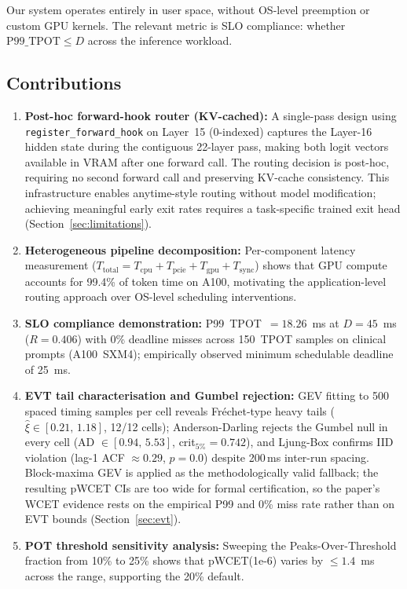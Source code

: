 \documentclass[conference]{IEEEtran}
\begin{document}
Our system operates entirely in user space, without OS-level preemption
or custom GPU kernels.
The relevant metric is SLO compliance: whether
$\text{P99\_TPOT} \leq D$ across the inference workload.

\subsection{Contributions}

\begin{enumerate}[leftmargin=*]
\item \textbf{Post-hoc forward-hook router (KV-cached):}
      A single-pass design using \texttt{register\_forward\_hook} on
      Layer~15 (0-indexed) captures the Layer-16 hidden state during the
      contiguous 22-layer pass, making both logit vectors available in
      VRAM after one forward call. The routing decision is post-hoc,
      requiring no second forward call and preserving KV-cache
      consistency. This infrastructure enables anytime-style routing
      without model modification; achieving meaningful early exit rates
      requires a task-specific trained exit head (Section~\ref{sec:limitations}).

\item \textbf{Heterogeneous pipeline decomposition:}
      Per-component latency measurement ($T_{\text{total}} =
      T_{\text{cpu}} + T_{\text{pcie}} + T_{\text{gpu}} + T_{\text{sync}}$)
      shows that GPU compute accounts for 99.4\% of token time on A100,
      motivating the application-level routing approach over OS-level
      scheduling interventions.

\item \textbf{SLO compliance demonstration:}
      P99~TPOT~$= 18.26$~ms at $D=45$~ms ($R=0.406$) with 0\% deadline
      misses across 150~TPOT samples on clinical prompts (A100~SXM4);
      empirically observed minimum schedulable deadline of 25~ms.

\item \textbf{EVT tail characterisation and Gumbel rejection:}
      GEV fitting to 500 spaced timing samples per cell reveals
      Fréchet-type heavy tails ($\hat{\xi} \in [0.21,\,1.18]$, 12/12 cells);
      Anderson-Darling rejects the Gumbel null in every cell (AD $\in [0.94,\,5.53]$,
      crit$_{5\%}{=}0.742$), and Ljung-Box confirms IID violation
      (lag-1 ACF ${\approx}0.29$, $p{=}0.0$) despite 200\,ms inter-run spacing.
      Block-maxima GEV is applied as the methodologically valid fallback;
      the resulting pWCET CIs are too wide for formal certification,
      so the paper's WCET evidence rests on the empirical P99 and 0\%
      miss rate rather than on EVT bounds (Section~\ref{sec:evt}).

\item \textbf{POT threshold sensitivity analysis:}
      Sweeping the Peaks-Over-Threshold fraction from 10\% to 25\%
      shows that pWCET(1e-6) varies by ${\le}1.4$~ms across the range,
      supporting the 20\% default.
\end{enumerate}
\end{document}
